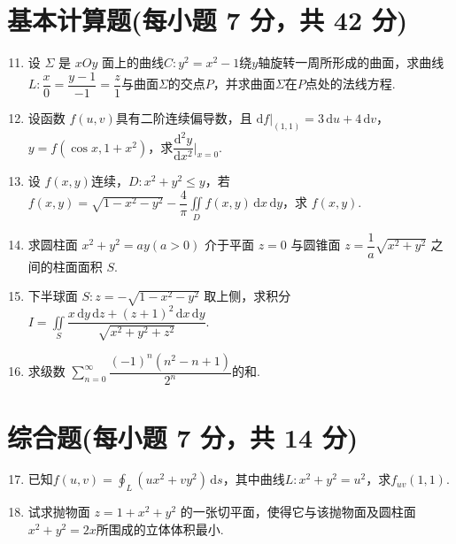 \documentclass[../main.tex]{subfiles}
\begin{document}
\section{基本计算题(每小题 7 分，共 42 分)}
\begin{enumerate}
  \setcounter{enumi}{10}
  \item 设 \( \Sigma \) 是 \( xOy \) 面上的曲线$C:y^2=x^2-1$绕$y$轴旋转一周所形成的曲面，求曲线$L:\dfrac{x}{0}=\dfrac{y-1}{-1}=\dfrac{z}{1}$与曲面$\Sigma$的交点$P$，并求曲面$\Sigma$在$P$点处的法线方程.
        \vspace{6em}

  \item 设函数 \( f(u,v) \)具有二阶连续偏导数，且 \( \mathrm{d}f\big|_{(1,1)}=3\,\mathrm{d}u+4\,\mathrm{d}v \)，\( y=f(\cos x,1+x^2) \)，求$\dfrac{\mathrm{d}^2 y}{\mathrm{d}x^2}\bigg|_{x=0}$.
        \vspace{9em}

  \item 设 \( f(x,y) \)连续，\( D:x^2+y^2 \leq y \)，若$f(x,y)=\sqrt{1-x^2-y^2}-\dfrac{4}{\pi}\displaystyle \iint\limits_D f(x,y)\,\mathrm{d}x\,\mathrm{d}y$，求 \( f(x,y) \).
        \vspace{9em}

  \item 求圆柱面 \( x^2+y^2=ay(a>0) \) 介于平面 \( z = 0 \) 与圆锥面 \( z=\dfrac{1}{a}\sqrt{x^2+y^2} \) 之间的柱面面积 \( S \).
        \vspace{9em}

  \item 下半球面 \( S:z=-\sqrt{1-x^2-y^2} \) 取上侧，求积分 \( I = \displaystyle \iint \limits_S \dfrac{x\,\mathrm{d}y\,\mathrm{d}z+(z+1)^2\,\mathrm{d}x\,\mathrm{d}y}{\sqrt{x^2+y^2+z^2}} \).
        \vspace{10em}

  \item 求级数 \( \displaystyle \sum \limits_{n=0}^{\infty}\dfrac{(-1)^n(n^2-n+1)}{2^n} \)的和.
        \vspace{10em}
\end{enumerate}

\section{综合题(每小题 7 分，共 14 分)}
\begin{enumerate}
  \setcounter{enumi}{16}
  \item 已知$f(u,v)=\displaystyle \oint_L (ux^2+vy^2)\,\mathrm{d}s$，其中曲线$L:x^2+y^2=u^2$，求$f_{uv}(1,1)$.
        \vspace{10em}

  \item 试求抛物面 \( z=1+x^2+y^2 \) 的一张切平面，使得它与该抛物面及圆柱面 \( x^2+y^2=2x \)所围成的立体体积最小.
        \vspace{10em}
\end{enumerate}
\end{document}
